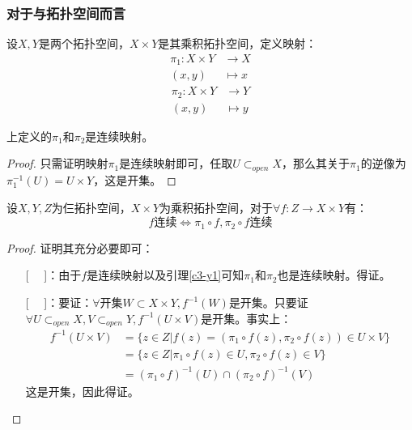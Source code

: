 \documentclass[lang=cn,10pt,device=pad]{elegantbook}
\newcommand{\cusong}{\CJKfamily{cusong}}%
\newcommand{\lei}[1]{~\textcolor{myblu}{\cusong{#1}}~}
\newcommand{\dkh}[1]{\{#1\}}
\begin{document}
\subsubsection{对于与拓扑空间而言}\label{c3223}
设$X,Y$是两个拓扑空间，$X\times Y$是其乘积拓扑空间，定义映射：
\begin{equation*}
	\begin{aligned}
		\pi_{1} : X\times Y&\longrightarrow X\\
		(x,y)&\longmapsto x
	\end{aligned}
\end{equation*}
\begin{equation*}
	\begin{aligned}
		\pi_{2} : X\times Y&\longrightarrow Y\\
		(x,y)&\longmapsto y
	\end{aligned}
\end{equation*}
\begin{lemma}\label{c3-y1}
	上定义的$\pi_{1}$和$\pi_{2}$是连续映射。
\end{lemma}
\begin{proof}
	只需证明映射$\pi_{1}$是连续映射即可，任取$U\subset_{open}X$，那么其关于$\pi_{1}$的逆像为$\pi_{1}^{-1}(U) = U\times Y$，这是开集。
\end{proof}
\begin{lemma}
	设$X,Y,Z$为仨拓扑空间，$X\times Y$为乘积拓扑空间，对于$\forall f:Z\longrightarrow X\times Y$有：
	\begin{equation*}
		f\text{连续}\iff	\pi_{1}\circ f,\pi_{2}\circ f\text{连续}
	\end{equation*}
\end{lemma}
\begin{proof}
	证明其充分必要即可：
	\begin{enumerate}
		\item[[\lei{$\Rightarrow $}]]：由于$f$是连续映射以及引理\ref{c3-y1}可知$\pi_{1}$和$\pi_{2}$也是连续映射。得证。
		\item[[\lei{$\Leftarrow $}]]：要证：$\forall$开集$W\subset X\times Y,f^{-1}(W)$是开集。只要证$\forall U\subset_{open}X,V\subset_{open}Y,f^{-1}(U\times V)$是开集。事实上：
		\begin{equation*}
			\begin{aligned}
				f^{-1}(U\times V) &= \dkh{z\in Z|f(z)=(\pi_{1}\circ f(z) , \pi_{2}\circ f(z)) \in U\times V}\\
				&=\dkh{z\in Z|\pi_{1}\circ f(z)\in U,\pi_{2}\circ f(z)\in V}\\
				&=(\pi_{1}\circ f)^{-1}(U)\cap(\pi_{2}\circ f)^{-1}(V)
			\end{aligned}
		\end{equation*}
		这是开集，因此得证。
	\end{enumerate}
\end{proof}
\end{document}
